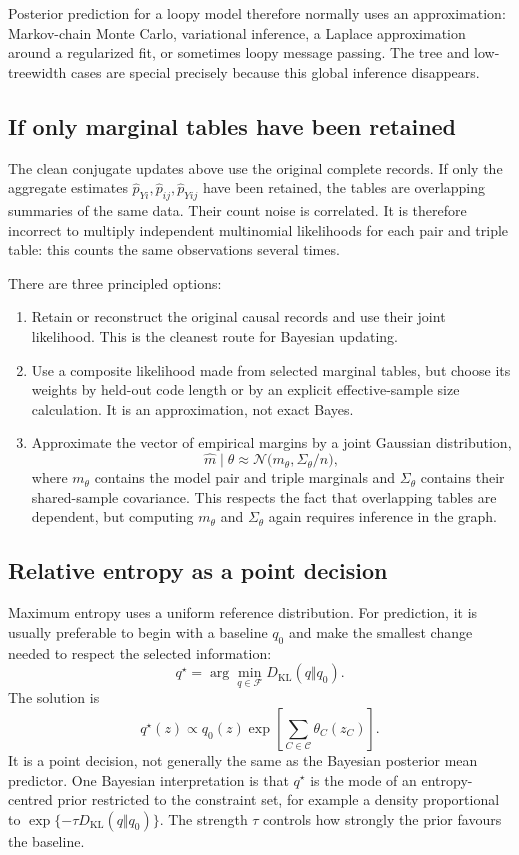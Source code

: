 \documentclass[11pt]{article}
\newcommand{\KL}{D_{\mathrm{KL}}}
\newcommand{\1}{\mathbf 1}
\newcommand{\mcC}{\mathcal C}
\newcommand{\hatp}{\widehat p}
\begin{document}
Posterior prediction for a loopy model therefore normally uses an
approximation: Markov-chain Monte Carlo, variational inference, a Laplace
approximation around a regularized fit, or sometimes loopy message passing.
The tree and low-treewidth cases are special precisely because this global
inference disappears.

\subsection{If only marginal tables have been retained}

The clean conjugate updates above use the original complete records.  If only
the aggregate estimates
\(\hatp_{Yi},\hatp_{ij},\hatp_{Yij}\) have been retained, the tables are
overlapping summaries of the same data.  Their count noise is correlated.  It
is therefore incorrect to multiply independent multinomial likelihoods for
each pair and triple table: this counts the same observations several times.

There are three principled options:
\begin{enumerate}
  \item Retain or reconstruct the original causal records and use their joint
  likelihood.  This is the cleanest route for Bayesian updating.
  \item Use a composite likelihood made from selected marginal tables, but
  choose its weights by held-out code length or by an explicit effective-sample
  size calculation.  It is an approximation, not exact Bayes.
  \item Approximate the vector of empirical margins by a joint Gaussian
  distribution,
  \[
    \hat m\mid\theta
    \approx
    \mathcal N\bigl(m_\theta,\Sigma_\theta/n\bigr),
  \]
  where \(m_\theta\) contains the model pair and triple marginals and
  \(\Sigma_\theta\) contains their shared-sample covariance.  This respects
  the fact that overlapping tables are dependent, but computing
  \(m_\theta\) and \(\Sigma_\theta\) again requires inference in the graph.
\end{enumerate}

\subsection{Relative entropy as a point decision}

Maximum entropy uses a uniform reference distribution.  For prediction, it is
usually preferable to begin with a baseline \(q_0\) and make the smallest
change needed to respect the selected information:
\begin{equation}
  q^\star
  =
  \arg\min_{q\in\mathcal F}
  \KL(q\Vert q_0).
  \label{eq:relative_entropy}
\end{equation}
The solution is
\[
  q^\star(z)
  \propto
  q_0(z)
  \exp\left[\sum_{C\in\mcC}\theta_C(z_C)\right].
\]
It is a point decision, not generally the same as the Bayesian posterior mean
predictor.  One Bayesian interpretation is that \(q^\star\) is the mode of an
entropy-centred prior restricted to the constraint set, for example a density
proportional to \(\exp\{-\tau\KL(q\Vert q_0)\}\).  The strength \(\tau\)
controls how strongly the prior favours the baseline.
\end{document}
